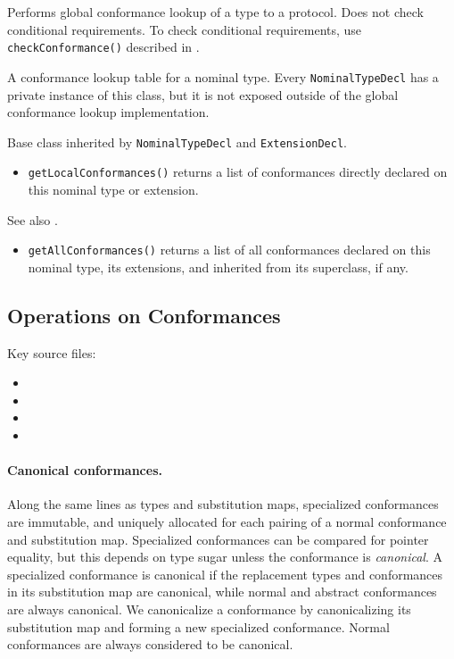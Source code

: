 \documentclass[../generics]{subfiles}
\begin{document}
Performs global conformance lookup of a type to a protocol. Does not check conditional requirements. To check conditional requirements, use \texttt{checkConformance()} described in .

A conformance lookup table for a nominal type. Every \texttt{NominalTypeDecl} has a private instance of this class, but it is not exposed outside of the global conformance lookup implementation.

Base class inherited by \texttt{NominalTypeDecl} and \texttt{ExtensionDecl}.
\begin{itemize}
\item \texttt{getLocalConformances()} returns a list of conformances directly declared on this nominal type or extension.
\end{itemize}

See also .
\begin{itemize}
\item \texttt{getAllConformances()} returns a list of all conformances declared on this nominal type, its extensions, and inherited from its superclass, if any.
\end{itemize}

\subsection*{Operations on Conformances}

Key source files:
\begin{itemize}
\item {}
\item {}
\item {}
\item {}
\end{itemize}

\paragraph{Canonical conformances.}
Along the same lines as types and substitution maps, specialized conformances are immutable, and uniquely allocated for each pairing of a normal conformance and substitution map. Specialized conformances can be compared for pointer equality, but this depends on type sugar unless the conformance is \emph{canonical}. A specialized conformance is canonical if the replacement types and conformances in its substitution map are canonical, while normal and abstract conformances are always canonical. We canonicalize a conformance by canonicalizing its substitution map and forming a new specialized conformance. Normal conformances are always considered to be canonical.
\end{document}
